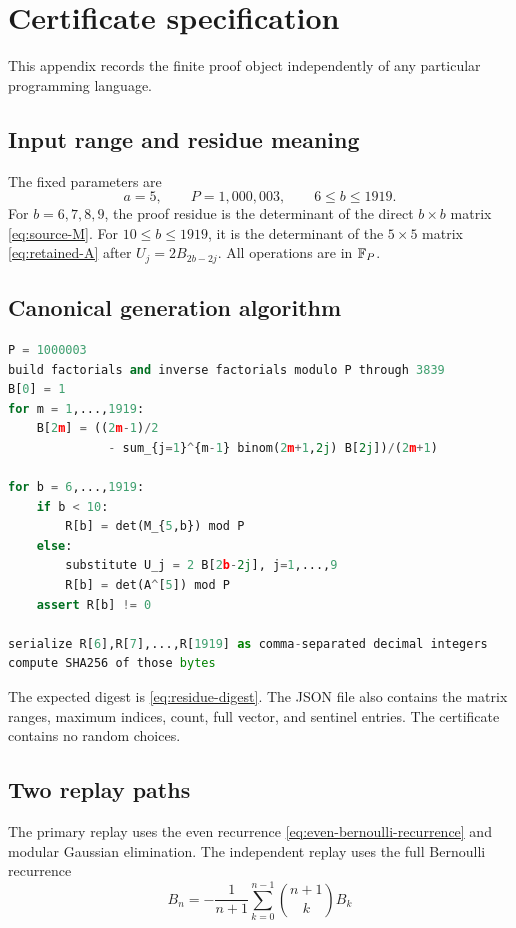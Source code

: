 \section{Certificate specification}
\label{app:certificate}

This appendix records the finite proof object independently of any
particular programming language.

\subsection{Input range and residue meaning}

The fixed parameters are
\[
 a=5,
 \qquad P=1{,}000{,}003,
 \qquad 6\le b\le1919.
\]
For $b=6,7,8,9$, the proof residue is the determinant of the direct
$b\times b$ matrix \eqref{eq:source-M}.  For $10\le b\le1919$, it is
the determinant of the $5\times5$ matrix \eqref{eq:retained-A} after
$U_j=2B_{2b-2j}$.  All operations are in $\mathbb{F}_P$.

\subsection{Canonical generation algorithm}

\begin{lstlisting}[language=Python,caption={Mathematical pseudocode for the residue vector.}]
P = 1000003
build factorials and inverse factorials modulo P through 3839
B[0] = 1
for m = 1,...,1919:
    B[2m] = ((2m-1)/2
              - sum_{j=1}^{m-1} binom(2m+1,2j) B[2j])/(2m+1)

for b = 6,...,1919:
    if b < 10:
        R[b] = det(M_{5,b}) mod P
    else:
        substitute U_j = 2 B[2b-2j], j=1,...,9
        R[b] = det(A^[5]) mod P
    assert R[b] != 0

serialize R[6],R[7],...,R[1919] as comma-separated decimal integers
compute SHA256 of those bytes
\end{lstlisting}

The expected digest is \eqref{eq:residue-digest}.  The JSON file also
contains the matrix ranges, maximum indices, count, full vector, and
sentinel entries.  The certificate contains no random choices.

\subsection{Two replay paths}

The primary replay uses the even recurrence
\eqref{eq:even-bernoulli-recurrence} and modular Gaussian elimination.
The independent replay uses the full Bernoulli recurrence
\[
 B_n=-\frac1{n+1}\sum_{k=0}^{n-1}\binom{n+1}{k}B_k
\]

